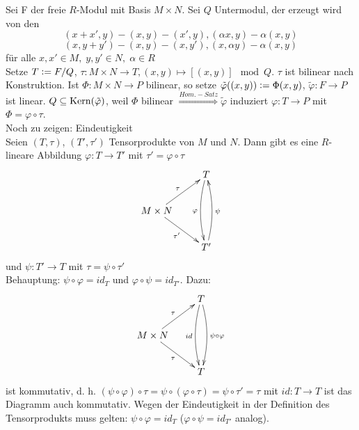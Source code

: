 \documentclass[a4paper, 10pt]{report}
\begin{document}
\begin{anBew}
  Sei F der freie $R$-Modul mit Basis $M \times N$.
  Sei $Q$ Untermodul, der erzeugt wird von den \[(x + x',y) - (x,y) - (x',y),
  (\alpha x,y) - \alpha (x,y)\] \[(x,y + y') - (x,y) - (x,y'),
  (x,\alpha y) - \alpha (x,y)\] für alle $x,x' \in M,\; y,y' \in N,\;\alpha \in
  R$\\
  Setze $T \mathrel{\mathop:}= F/Q$, $\tau: M \times N \to T, (x,y) \mapsto [(x,y)]
  \mod Q$. $\tau$ ist bilinear nach Konstruktion.
  Ist $\Phi: M \times N \to P$ bilinear, so setze $\tilde{\varphi}((x,y))
  \mathrel{\mathop:}= \Phi(x,y)$, $\tilde{\varphi}: F \to P$ ist linear. $Q \subseteq
  \mathrm{Kern}(\tilde{\varphi})$, weil $\Phi$ bilinear $\overset{Hom.-Satz}{\Rightarrow}
  \tilde{\varphi}$ induziert $\varphi: T \to P$ mit $\Phi = \varphi \circ \tau$.\\
  Noch zu zeigen: Eindeutigkeit\\
  Seien $(T, \tau)$, $(T', \tau')$ Tensorprodukte von $M$ und $N$. Dann gibt es eine $R$-lineare 
  Abbildung $\varphi: T \rightarrow T'$ mit $\tau'= \varphi \circ \tau$
  \[\begin{xy}
      \xymatrix{
                                                  & T \ar@/_/[dd]_{\varphi} \\
        M \times N \ar[ur]^{\tau} \ar[dr]_{\tau'} &                     \\
                                                  & T' \ar@/_/[uu]_{\psi}
      }
    \end{xy}\]
  und $\psi: T' \rightarrow T$ mit $\tau = \psi \circ\tau'$\\
  Behauptung: $\psi \circ \varphi = id_T$ und $\varphi \circ \psi = id_{T'}$. Dazu:
  \[\begin{xy}
      \xymatrix{
                                                 & T \ar@/_/[dd]_{id}
                                                 \ar@/^/[dd]^{\psi \circ \varphi} \\
        M \times N \ar[ur]^{\tau} \ar[dr]_{\tau} &                     \\
                                                 & T
      }
    \end{xy}\]
  ist kommutativ, d. h. 
  $(\psi \circ \varphi ) \circ \tau = \psi \circ ( \varphi \circ \tau) = \psi \circ \tau' = \tau$
  mit $id: T \rightarrow T$ ist das Diagramm auch kommutativ. Wegen der Eindeutigkeit in der 
  Definition des Tensorprodukts muss gelten: $\psi \circ \varphi = id_T$
  ($\varphi \circ \psi = id_{T'}$ analog).
\end{anBew}
\end{document}
